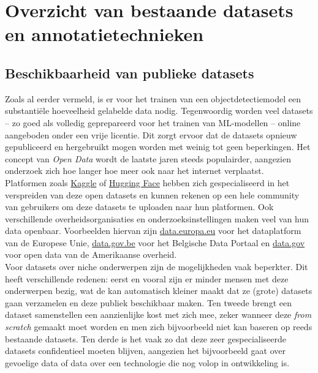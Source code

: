\section{Overzicht van bestaande datasets en annotatietechnieken}

\subsection{Beschikbaarheid van publieke datasets}

Zoals al eerder vermeld, is er voor het trainen van een objectdetectiemodel een substantiële hoeveelheid gelabelde data nodig. Tegenwoordig worden veel datasets -- zo goed als volledig geprepareerd voor het trainen van ML-modellen -- online aangeboden onder een vrije licentie. Dit zorgt ervoor dat de datasets opnieuw gepubliceerd en hergebruikt mogen worden met weinig tot geen beperkingen. Het concept van \emph{Open Data} wordt de laatste jaren steeds populairder, aangezien onderzoek zich hoe langer hoe meer ook naar het internet verplaatst. \autocite{Murray_Rust_2008} \\

Platformen zoals \href{https://www.kaggle.com/datasets}{Kaggle} of \href{https://huggingface.co/datasets}{Hugging Face} hebben zich gespecialiseerd in het verspreiden van deze open datasets en kunnen rekenen op een hele community van gebruikers om deze datasets te uploaden naar hun platformen. Ook verschillende overheidsorganisaties en onderzoeksinstellingen maken veel van hun data openbaar. Voorbeelden hiervan zijn \href{https://data.europa.eu/}{data.europa.eu} voor het dataplatform van de Europese Unie, \href{https://data.gov.be/nl}{data.gov.be} voor het Belgische Data Portaal en \href{https://data.gov/}{data.gov} voor open data van de Amerikaanse overheid. \\

Voor datasets over niche onderwerpen zijn de mogelijkheden vaak beperkter. Dit heeft verschillende redenen: eerst en vooral zijn er minder mensen met deze onderwerpen bezig, wat de kan automatisch kleiner maakt dat ze (grote) datasets gaan verzamelen en deze publiek beschikbaar maken. Ten tweede brengt een dataset samenstellen een aanzienlijke kost met zich mee, zeker wanneer deze \textit{from scratch} gemaakt moet worden en men zich bijvoorbeeld niet kan baseren op reeds bestaande datasets. Ten derde is het vaak zo dat deze zeer gespecialiseerde datasets confidentieel moeten blijven, aangezien het bijvoorbeeld gaat over gevoelige data of data over een technologie die nog volop in ontwikkeling is.

